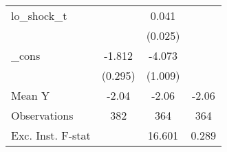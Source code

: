 {\begin{tabular}{l*{3}{c}}
\addlinespace
lo\_shock\_t  &                     &       0.041         &                     \\
            &                     &     (0.025)         &                     \\
\addlinespace
\_cons      &      -1.812\sym{***}&      -4.073\sym{***}&                     \\
            &     (0.295)         &     (1.009)         &                     \\
\midrule
Mean Y      &       -2.04         &       -2.06         &       -2.06         \\
Observations&         382         &         364         &         364         \\
Exc. Inst. F-stat&                     &      16.601         &       0.289         \\
\bottomrule
\end{tabular}
}
